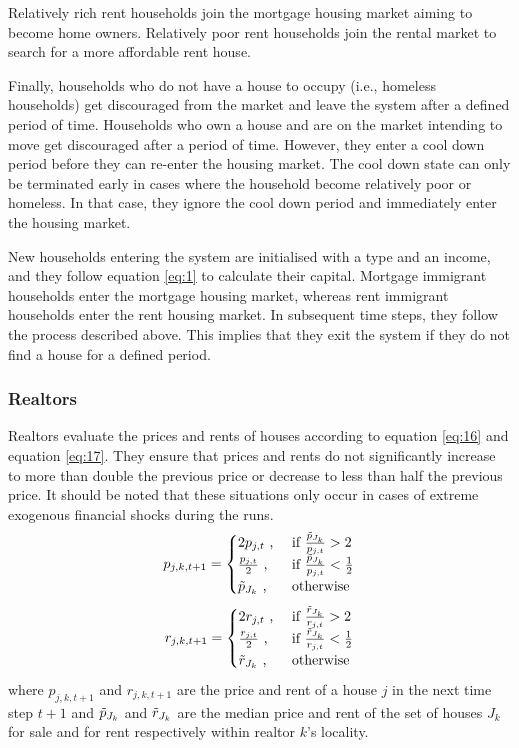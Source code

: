 Relatively rich rent households join the mortgage housing market aiming to become home owners. Relatively poor rent households join the rental market to search for a more affordable rent house.

Finally, households who do not have a house to occupy (i.e., homeless households) get discouraged from the market and leave the system after a defined period of time. Households who own a house and are on the market intending to move get discouraged after a period of time. However, they enter a cool down period before they can re-enter the housing market. The cool down state can only be terminated early in cases where the household become relatively poor or homeless. In that case, they ignore the cool down period and immediately enter the housing market.

New households entering the system are initialised with a type and an income, and they follow equation \ref{eq:1} to calculate their capital. Mortgage immigrant households enter the mortgage housing market, whereas rent immigrant households enter the rent housing market. In subsequent time steps, they follow the process described above. This implies that they exit the system if they do not find a house for a defined period. 

\subsubsection{Realtors}
Realtors evaluate the prices and rents of houses according to equation \ref{eq:16} and equation \ref{eq:17}. They ensure that prices and rents do not significantly increase to more than double the previous price or decrease to less than half the previous price. It should be noted that these situations only occur in cases of extreme exogenous financial shocks during the runs.
\begin{equation} \label{eq:16}
    p_{j,k,t+1} = 
    \begin{cases}
        2p_{j,t} \text{ ,} & \text{ if } \frac{\Tilde{p}_{J_k}}{p_{j,t}} > 2 \\
        \frac{p_{j,t}}{2} \text{ ,} & \text{ if } \frac{\Tilde{p}_{J_k}}{p_{j,t}} < \frac{1}{2} \\
        \Tilde{p}_{J_k} \text{ ,} & \text{ otherwise}
    \end{cases}
\end{equation}
\begin{equation} \label{eq:17}
    r_{j,k,t+1} = 
    \begin{cases}
        2r_{j,t} \text{ ,} & \text{ if } \frac{\Tilde{r}_{J_k}}{r_{j,t}} > 2 \\
        \frac{r_{j,t}}{2} \text{ ,} & \text{ if } \frac{\Tilde{r}_{J_k}}{r_{j,t}} < \frac{1}{2} \\
        \Tilde{r}_{J_k} \text{ ,} & \text{ otherwise}
    \end{cases}
\end{equation}
where \(p_{j,k,t+1}\) and \(r_{j,k,t+1}\) are the price and rent of a house \(j\) in the next time step \(t+1\) and \(\Tilde{p}_{J_k}\) and \(\Tilde{r}_{J_k}\) are the median price and rent of the set of houses \(J_k\) for sale and for rent respectively within realtor \(k\)'s locality.


